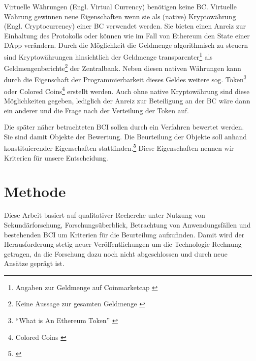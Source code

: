 Virtuelle Währungen (Engl. Virtual Currency) benötigen keine \gls{BC}.
Virtuelle Währung gewinnen neue Eigenschaften wenn sie als (native) Kryptowährung (Engl. Cryptocurrency) einer \gls{BC} verwendet werden.
Sie bieten einen Anreiz zur Einhaltung des Protokolls oder können wie im Fall von Ethereum den State einer \gls{DApp} verändern.
Durch die Möglichkeit die Geldmenge algorithmisch zu steuern sind Kryptowährungen hinsichtlich der Geldmenge transparenter\footnote{Angaben zur Geldmenge \zB{} auf Coinmarketcap \autocite{w:cmc}} als Geldmengenberichte\footnote{Keine Aussage zur gesamten Geldmenge \autocite{w:ecb-moneydev}} der Zentralbank.
Neben diesen nativen Währungen kann \ua{} durch die Eigenschaft der Programmierbarkeit dieses Geldes weitere sog. Token\footnote{\enquote{What is An Ethereum Token} \autocite{w:eth-token}} oder Colored Coins\footnote{Colored Coins \autocite{b:mastering-bitcoin}%
} erstellt werden.
Auch ohne native Kryptowährung sind diese Möglichkeiten gegeben, lediglich der Anreiz zur Beteiligung an der \gls{BC} wäre dann ein anderer und die Frage nach der Verteilung der Token auf.

Die später näher betrachteten \gls{BCI} sollen durch ein Verfahren bewertet werden.
Sie sind damit Objekte der Bewertung.
Die Beurteilung der Objekte soll anhand konstituierender Eigenschaften stattfinden.\footnote{\cite{b:strassert:entscheidungen}}
Diese Eigenschaften nennen wir Kriterien für unsere Entscheidung.

\section{Methode}

Diese Arbeit basiert auf qualitativer Recherche unter Nutzung von Sekundärforschung, Forschungsüberblick, Betrachtung von Anwendungsfällen und bestehenden \gls{BCI} um Kriterien für die Beurteilung aufzufinden.
Damit wird der Herausforderung stetig neuer Veröffentlichungen um die Technologie Rechnung getragen, da die Forschung dazu noch nicht abgeschlossen und durch neue Ansätze geprägt ist.

